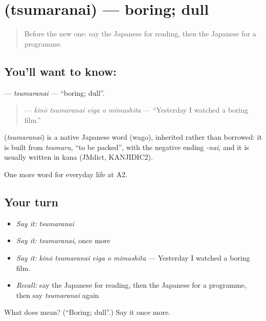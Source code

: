 \section[\texorpdfstring{\ja{つまらない} (tsumaranai)}{つまらない (tsumaranai)}]{ (tsumaranai) — boring; dull}

\label{lesson:JA-C238-tsumaranai}



\begin{quote}
Before the new one: say the Japanese for reading, then the Japanese for a programme.
\end{quote}

\subsection*{You'll want to know: }
\textbf{} — \emph{tsumaranai} — \textquotedblleft{}boring; dull\textquotedblright{}.

\begin{quote}
\textbf{   } — \emph{kinō tsumaranai eiga o mimashita} — \textquotedblleft{}Yesterday I watched a boring film.\textquotedblright{}
\end{quote}

\begin{cousinweb}
\textbf{} (\emph{tsumaranai}) is a native Japanese word (wago), inherited rather than borrowed: it is built from \emph{tsumaru}, \textquotedblleft{}to be packed\textquotedblright{}, with the negative ending \emph{-nai}, and it is usually written in kana (JMdict, KANJIDIC2).
\end{cousinweb}

\begin{grammarlens}[title={What you've built}]
One more word for everyday life at A2.
\end{grammarlens}

\subsection*{Your turn}
\begin{itemize}
\raggedright
  \item \emph{Say it:} \emph{tsumaranai}
  \item \emph{Say it:} \emph{tsumaranai}, once more
  \item \emph{Say it:} \emph{kinō tsumaranai eiga o mimashita} — Yesterday I watched a boring film.
  \item \emph{Recall:} say the Japanese for reading, then the Japanese for a programme, then say \emph{tsumaranai} again
\end{itemize}

\begin{tcolorbox}[breakable,colback=teal!4,colframe=teal!35!black,title={Before you move on}]
What does  mean? (\textquotedblleft{}Boring; dull\textquotedblright{}.) Say it once more.
\end{tcolorbox}

